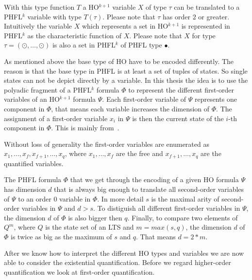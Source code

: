 With this type function $T$ a HO$^{k + 1}$ variable $X$ of type $\tau$ can be translated to a PHFL$^k$ variable
with type $T(\tau)$. Please note that $\tau$ has order $2$ or greater. Intuitively the variable $X$ which represents a
set in HO$^{k+1}$ is represented in PHFL$^k$ as the characteristic function of $X$. Please note that $X$ for type
$\tau = (\odot, \dots, \odot)$ is also a set in PHFL$^k$ of PHFL type $\bullet$.

As mentioned above the base type of HO have to be encoded differently. The reason is that the base type in PHFL is at
least a set of tuples of states. So single states can not be depict directly by a variable. In this thesis the
idea is to use the polyadic fragment of a PHFL$^k$ formula $\Phi$ to represent the different first-order variables of an
HO$^{k+1}$ formula $\Psi$. Each first-order variable of $\Psi$ represents one component in $\Phi$, that means each
variable
increases the dimension of $\Phi$. The assignment of a first-order variable $x_i$ in $\Psi$ is then the current state
of the $i$-th component in $\Phi$. This is mainly from~\cite{lange2014capturing}.

Without loss of generality the first-order variables are enumerated as $x_1, \dots, x_f, x_{f + 1}, \dots, x_q$,
where $x_1, \dots, x_f$ are the free and $x_{f+1}, \dots, x_q$ are the quantified variables.

\begin{remark}
    The PHFL formula $\Phi$ that we get through the encoding of a given HO formula $\Psi$ has dimension
    $d$ that is always big enough to translate all second-order variables of $\Psi$ to an order $0$ variable in
    $\Phi$. In more detail $s$ is the maximal arity of second-order variables in $\Psi$ and $d > s$. To distiguish all
    different first-order variables in $\Psi$, the dimension $d$ of $\Phi$ is also bigger then $q$.  Finally, to compare
    two
    elements of $Q^{m}$, where $Q$ is the state set of an LTS and $m = max({s, q})$, the dimension $d$ of $\Phi$ is
    twice as big as the maximum of $s$ and $q$. That means $d = 2 * m$.
\end{remark}

After we know how to interpret the different HO types and variables we are now able to consider the existential
quantification. Before we regard higher-order quantification we look at first-order quantification.

